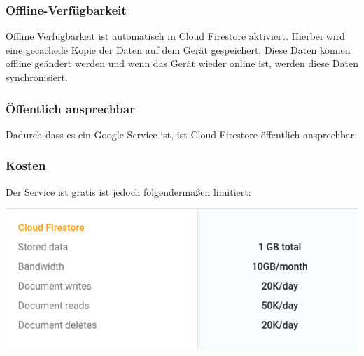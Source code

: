 \subsubsection{Offline-Verfügbarkeit}
Offline Verfügbarkeit ist automatisch in Cloud Firestore aktiviert. Hierbei wird eine gecachede Kopie der Daten auf dem Gerät gespeichert. Diese Daten können offline geändert werden und wenn das Gerät wieder online ist, werden diese Daten synchronisiert.  \cite{EnableOf96:online}
\subsubsection{Öffentlich ansprechbar}
Dadurch dass es ein Google Service ist, ist Cloud Firestore öffentlich ansprechbar.
\subsubsection{Kosten}
Der Service ist gratis ist jedoch folgendermaßen limitiert:


\begin{minipage}{\linewidth}
	\centering
	\includegraphics[width=0.7\linewidth]{images/4}
\end{minipage}

